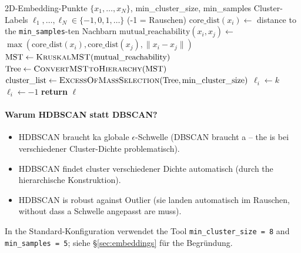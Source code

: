 \documentclass[11pt,a4paper,twoside]{article}
\theoremstyle{remark}
\begin{document}
\begin{algorithm}[H]
\caption{\textsc{HDBSCANCluster}}
\begin{algorithmic}[1]
\Require 2D-Embedding-Punkte $\{x_1, \ldots, x_N\}$,
         min\_cluster\_size, min\_samples
\Ensure Cluster-Labels $\ell_1, \ldots, \ell_N \in \{-1, 0, 1, \ldots\}$
       (-1 = Rauschen)
\State {}
\State $\text{core\_dist}(x_i) \gets$ distance to the \texttt{min\_samples}-ten Nachbarn
\State $\text{mutual\_reachability}(x_i, x_j) \gets$
       $\max(\text{core\_dist}(x_i), \text{core\_dist}(x_j),
       \|x_i - x_j\|)$
\State {}
\State $\text{MST} \gets \textsc{KruskalMST}(\text{mutual\_reachability})$
\State {}
\State $\text{Tree} \gets \textsc{ConvertMSTtoHierarchy}(\text{MST})$
\State {}
\State $\text{cluster\_list} \gets \textsc{ExcessOfMassSelection}(\text{Tree},
       \text{min\_cluster\_size})$
\State {}
    \State $\ell_i \gets k$
  \Else
    \State $\ell_i \gets -1$  
  \EndIf
\EndFor
\State \textbf{return} $\boldsymbol{\ell}$
\end{algorithmic}
\end{algorithm}

\paragraph{Warum HDBSCAN statt DBSCAN?}
\begin{itemize}\setlength{\itemsep}{0pt}
  \item HDBSCAN braucht ka globale $\epsilon$-Schwelle (DBSCAN
        braucht a -- the is bei verschiedener Cluster-Dichte
        problematisch).
  \item HDBSCAN findet cluster verschiedener Dichte automatisch (durch
        the hierarchische Konstruktion).
  \item HDBSCAN is robust against Outlier (sie landen automatisch im
        Rauschen, without dass a Schwelle angepasst are muss).
\end{itemize}

In the Standard-Konfiguration verwendet the Tool
\texttt{min\_cluster\_size = 8} and \texttt{min\_samples = 5}; siehe
\S\ref{sec:embeddings} f\"ur the Begr\"undung.
\end{document}
